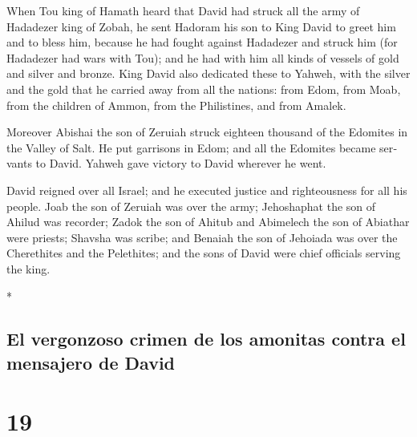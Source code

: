 \begin{paracol}{2}
\begin{otherlanguage}{english}
 When Tou king of Hamath heard that David had struck all
the army of Hadadezer king of Zobah,  he sent Hadoram his
son to King David to greet him and to bless him, because he had fought
against Hadadezer and struck him (for Hadadezer had wars with Tou); and
he had with him all kinds of vessels of gold and silver and bronze.
 King David also dedicated these to Yahweh, with the
silver and the gold that he carried away from all the nations: from
Edom, from Moab, from the children of Ammon, from the Philistines, and
from Amalek.

 Moreover Abishai the son of Zeruiah struck eighteen
thousand of the Edomites in the Valley of Salt.  He put
garrisons in Edom; and all the Edomites became servants to David. Yahweh
gave victory to David wherever he went.

 David reigned over all Israel; and he executed justice
and righteousness for all his people.  Joab the son of
Zeruiah was over the army; Jehoshaphat the son of Ahilud was recorder;
 Zadok the son of Ahitub and Abimelech the son of
Abiathar were priests; Shavsha was scribe;  and Benaiah
the son of Jehoiada was over the Cherethites and the Pelethites; and the
sons of David were chief officials serving the king.

\end{otherlanguage}

\switchcolumn[0]*

\hypertarget{el-vergonzoso-crimen-de-los-amonitas-contra-el-mensajero-de-david}{%
\subsection{El vergonzoso crimen de los amonitas contra el mensajero de
David}\label{el-vergonzoso-crimen-de-los-amonitas-contra-el-mensajero-de-david}}

\hypertarget{section-36}{%
\section{19}\label{section-36}}


\end{paracol}
